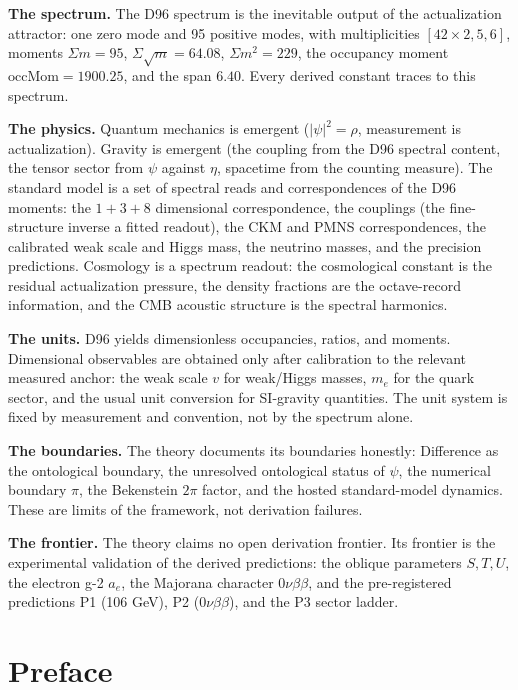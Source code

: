 \textbf{The spectrum.} The D96 spectrum is the inevitable output of the actualization
attractor: one zero mode and 95 positive modes, with multiplicities
$[42\times2,5,6]$, moments $\Sigma m=95$, $\Sigma\sqrt{m}=64.08$, $\Sigma m^2=229$, the
occupancy moment $\mathrm{occMom}=1900.25$, and the span $6.40$. Every derived constant
traces to this spectrum.

\textbf{The physics.} Quantum mechanics is emergent ($|\psi|^2=\rho$, measurement is
actualization). Gravity is emergent (the coupling from the D96 spectral content, the tensor
sector from $\psi$ against $\eta$, spacetime from the counting measure). The standard model
is a set of spectral reads and correspondences of the D96 moments: the $1+3+8$ dimensional
correspondence, the couplings (the fine-structure inverse a fitted readout), the CKM and
PMNS correspondences, the calibrated weak scale and Higgs mass, the neutrino masses, and
the precision predictions. Cosmology is a spectrum readout: the cosmological constant is the
residual actualization pressure, the density fractions are the octave-record information,
and the CMB acoustic structure is the spectral harmonics.

\textbf{The units.} D96 yields dimensionless occupancies, ratios, and moments. Dimensional
observables are obtained only after calibration to the relevant measured anchor: the weak
scale $v$ for weak/Higgs masses, $m_e$ for the quark sector, and the usual unit conversion
for SI-gravity quantities. The unit system is fixed by measurement and convention, not by
the spectrum alone.

\textbf{The boundaries.} The theory documents its boundaries honestly: Difference as the
ontological boundary, the unresolved ontological status of $\psi$, the numerical boundary
$\pi$, the Bekenstein $2\pi$ factor, and the hosted standard-model dynamics. These are
limits of the framework, not derivation failures.

\textbf{The frontier.} The theory claims no open derivation frontier. Its frontier is the
experimental validation of the derived predictions: the oblique parameters $S,T,U$, the
electron g-2 $a_e$, the Majorana character $0\nu\beta\beta$, and the pre-registered
predictions P1 (106 GeV), P2 ($0\nu\beta\beta$), and the P3 sector ladder.

\chapter*{Preface}
\label{fm:abs:preface}

